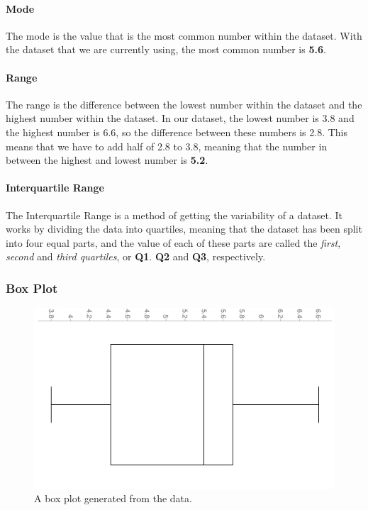 \documentclass[a4paper,12pt]{article}
\begin{document}
      \paragraph{Mode}
        The mode is the value that is the most common number within the dataset. With the dataset that we are currently using, the most common number is \textbf{5.6}.

      \paragraph{Range}
        The range is the difference between the lowest number within the dataset and the highest number within the dataset. In our dataset, the lowest number is 3.8 and the highest number is 6.6, so the difference between these numbers is 2.8. This means that we have to add half of 2.8 to 3.8, meaning that the number in between the highest and lowest number is \textbf{5.2}.

      \paragraph{Interquartile Range}
        The Interquartile Range is a method of getting the variability of a dataset. It works by dividing the data into quartiles, meaning that the dataset has been split into four equal parts, and the value of each of these parts are called the \textit{first}, \textit{second} and \textit{third quartiles}, or \textbf{Q1}. \textbf{Q2} and \textbf{Q3}, respectively.

  \newpage

  \subsubsection{Box Plot}
    \begin{figure}[h!]
      \includegraphics[width=\linewidth]{boxplot.jpg}
      \caption{A box plot generated from the data.}
      \label{fig:chart2}
    \end{figure}
\end{document}
